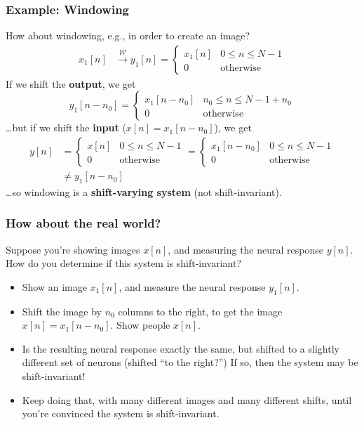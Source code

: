 \documentclass{beamer}
\begin{document}
\begin{frame}
  \frametitle{Example: Windowing}

  How about windowing, e.g., in order to create an image?
  \begin{align*}
    x_1[n] &\stackrel{\mathcal W}{\longrightarrow} y_1[n]=
    \begin{cases}
      x_1[n] & 0\le n\le N-1\\
      0 & \mbox{otherwise}
    \end{cases}
  \end{align*}
  If we shift the {\bf output}, we get
  \[
  y_1[n-n_0] = 
  \begin{cases}
    x_1[n-n_0] & n_0\le n\le N-1+n_0\\
    0 & \mbox{otherwise}
  \end{cases}
  \]
  \ldots but if we shift the {\bf input} ($x[n]=x_1[n-n_0]$), we get
  \begin{align*}
  y[n]&=
  \begin{cases}
    x[n] & 0\le n\le N-1\\
    0 & \mbox{otherwise}
  \end{cases}
  =
  \begin{cases}
    x_1[n-n_0] & 0\le n\le N-1\\
    0 & \mbox{otherwise}
  \end{cases}\\
  &\ne y_1[n-n_0]
  \end{align*}
  \ldots so windowing is a {\bf shift-varying system} (not shift-invariant).
\end{frame}

\begin{frame}
  \frametitle{How about the real world?}

  Suppose you're showing images $x[n]$, and measuring the neural
  response $y[n]$.  How do you determine if this system is
  shift-invariant?
  \begin{itemize}
  \item Show an image $x_1[n]$, and measure the neural response $y_1[n]$.
  \item Shift the image by $n_0$ columns to the right, to get the
    image $x[n]=x_1[n-n_0]$.  Show people $x[n]$.
  \item Is the resulting neural response exactly the same, but shifted
    to a slightly different set of neurons (shifted ``to the right?'')
    If so, then the system may be shift-invariant!
  \item Keep doing that, with many different images and many different
    shifts, until you're convinced the system is shift-invariant.
  \end{itemize}
\end{frame}
\end{document}
